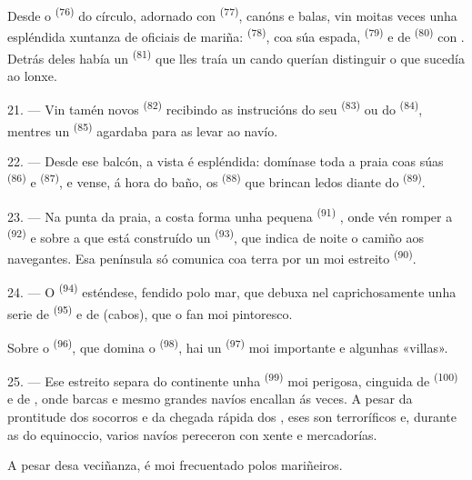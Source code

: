 Desde o  \textsuperscript{(76)} do círculo, adornado con
 \textsuperscript{(77)}, canóns e balas, vin moitas veces unha
espléndida xuntanza de oficiais de mariña: 
\textsuperscript{(78)}, coa súa espada, 
\textsuperscript{(79)} e de  \textsuperscript{(80)} con
. Detrás deles había un  \textsuperscript{(81)} que
lles traía un  cando querían distinguir o que sucedía ao lonxe.

21. --- Vin tamén novos  \textsuperscript{(82)} recibindo as
instrucións do seu  \textsuperscript{(83)} ou do
 \textsuperscript{(84)}, mentres un 
\textsuperscript{(85)} agardaba para as levar ao navío.

22. --- Desde ese balcón, a vista é espléndida: domínase toda a praia coas súas
 \textsuperscript{(86)} e  \textsuperscript{(87)}, e
vense, á hora do baño, os  \textsuperscript{(88)} que brincan ledos
diante do  \textsuperscript{(89)}.

23. --- Na punta da praia, a costa forma unha pequena 
\textsuperscript{(91)} , onde vén romper a 
\textsuperscript{(92)} e sobre a que está construído un 
\textsuperscript{(93)}, que indica de noite o camiño aos navegantes. Esa península só
comunica coa terra por un  moi estreito \textsuperscript{(90)}.

\VUsaut{3.0mm}
\VUsaut{3.0mm}

24. --- O  \textsuperscript{(94)} esténdese, fendido polo mar, que
debuxa nel caprichosamente unha serie de  \textsuperscript{(95)} e de
 (cabos), que o fan moi pintoresco.

Sobre o  \textsuperscript{(96)}, que domina o 
\textsuperscript{(98)}, hai un  \textsuperscript{(97)} moi importante e
algunhas «villas».

25. --- Ese estreito separa do continente unha  \textsuperscript{(99)} moi
perigosa, cinguida de  \textsuperscript{(100)} e de
, onde barcas e mesmo grandes navíos encallan ás veces. A pesar da
prontitude dos socorros e da chegada rápida dos , eses
 son terroríficos e, durante as  do equinoccio,
varios navíos pereceron con xente e mercadorías.

A pesar desa veciñanza,  é moi frecuentado polos mariñeiros.
